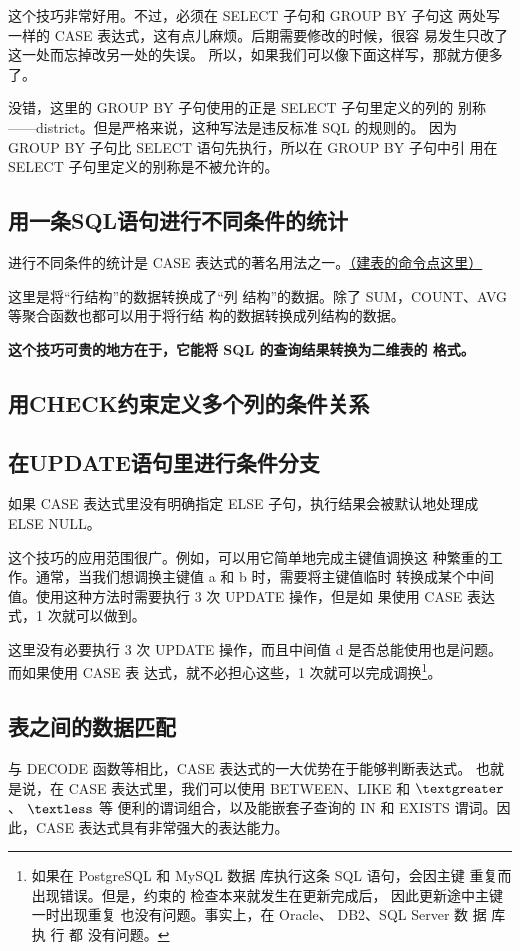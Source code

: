 这个技巧非常好用。不过，必须在 SELECT 子句和 GROUP BY 子句这
两处写一样的 CASE 表达式，这有点儿麻烦。后期需要修改的时候，很容
易发生只改了这一处而忘掉改另一处的失误。
所以，如果我们可以像下面这样写，那就方便多了。


没错，这里的 GROUP BY 子句使用的正是 SELECT 子句里定义的列的
别称——district。但是严格来说，这种写法是违反标准 SQL 的规则的。
因为 GROUP BY 子句比 SELECT 语句先执行，所以在 GROUP BY 子句中引
用在 SELECT 子句里定义的别称是不被允许的。

\subsection{用一条SQL语句进行不同条件的统计}
进行不同条件的统计是 CASE 表达式的著名用法之一。\href{https://github.com/JPL-JUNO/SQL/blob/main/ASQLP/PopTbl2.sql}{（建表的命令点这里）}


这里是将“行结构”的数据转换成了“列
结构”的数据。除了 SUM，COUNT、AVG 等聚合函数也都可以用于将行结
构的数据转换成列结构的数据。

\textbf{这个技巧可贵的地方在于，它能将 SQL 的查询结果转换为二维表的
    格式。}
\subsection{用CHECK约束定义多个列的条件关系}
\subsection{在UPDATE语句里进行条件分支}
如果 CASE 表达式里没有明确指定 ELSE 子句，执行结果会被默认地处理成 ELSE NULL。

这个技巧的应用范围很广。例如，可以用它简单地完成主键值调换这
种繁重的工作。通常，当我们想调换主键值 a 和 b 时，需要将主键值临时
转换成某个中间值。使用这种方法时需要执行 3 次 UPDATE 操作，但是如
果使用 CASE 表达式，1 次就可以做到。

这里没有必要执行 3 次
UPDATE 操作，而且中间值 d 是否总能使用也是问题。而如果使用 CASE 表
达式，就不必担心这些，1 次就可以完成调换\footnote{如果在 PostgreSQL 和 MySQL 数据
    库执行这条 SQL 语句，会因主键
    重复而出现错误。但是，约束的
    检查本来就发生在更新完成后，
    因此更新途中主键一时出现重复
    也没有问题。事实上，在 Oracle、
    DB2、SQL Server 数 据 库 执 行 都
    没有问题。}。

\subsection{表之间的数据匹配}
与 DECODE 函数等相比，CASE 表达式的一大优势在于能够判断表达式。
也就是说，在 CASE 表达式里，我们可以使用 BETWEEN、LIKE 和 $\textgreater$、 $\textless$ 等
便利的谓词组合，以及能嵌套子查询的 IN 和 EXISTS 谓词。因此，CASE
表达式具有非常强大的表达能力。


